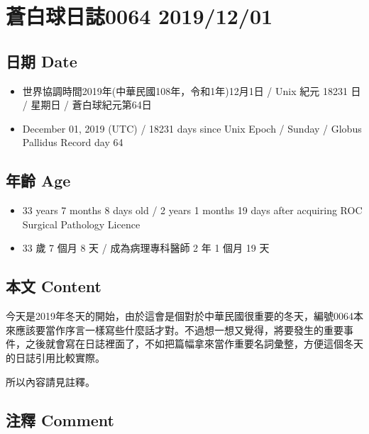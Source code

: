 \documentclass[
]{article}
\date{}
\providecommand{\tightlist}{%
  \setlength{\itemsep}{0pt}\setlength{\parskip}{0pt}}
\begin{document}
\hypertarget{ux84bcux767dux7403ux65e5ux8a8c0064-20191201}{%
\section{蒼白球日誌0064
2019/12/01}\label{ux84bcux767dux7403ux65e5ux8a8c0064-20191201}}

\hypertarget{ux65e5ux671f-date}{%
\subsection{日期 Date}\label{ux65e5ux671f-date}}

\begin{itemize}
\tightlist
\item
  世界協調時間2019年(中華民國108年，令和1年)12月1日 / Unix 紀元 18231 日
  / 星期日 / 蒼白球紀元第64日
\item
  December 01, 2019 (UTC) / 18231 days since Unix Epoch / Sunday /
  Globus Pallidus Record day 64
\end{itemize}

\hypertarget{ux5e74ux9f61-age}{%
\subsection{年齡 Age}\label{ux5e74ux9f61-age}}

\begin{itemize}
\tightlist
\item
  33 years 7 months 8 days old / 2 years 1 months 19 days after
  acquiring ROC Surgical Pathology Licence
\item
  33 歲 7 個月 8 天 / 成為病理專科醫師 2 年 1 個月 19 天
\end{itemize}

\hypertarget{ux672cux6587-content}{%
\subsection{本文 Content}\label{ux672cux6587-content}}

今天是2019年冬天的開始，由於這會是個對於中華民國很重要的冬天，編號0064本來應該要當作序言一樣寫些什麼話才對。不過想一想又覺得，將要發生的重要事件，之後就會寫在日誌裡面了，不如把篇幅拿來當作重要名詞彙整，方便這個冬天的日誌引用比較實際。

所以內容請見註釋。

\hypertarget{ux6ce8ux91cb-comment}{%
\subsection{注釋 Comment}\label{ux6ce8ux91cb-comment}}
\end{document}
